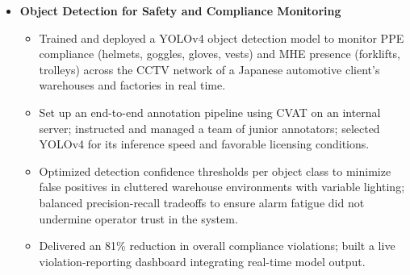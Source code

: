 \documentclass[a4paper,11pt]{article}
\begin{document}
\begin{itemize}[leftmargin=*, itemsep = -1pt]
\begin{itemize}[itemsep = -1pt]
          \item {Fine-tuned EfficientNet-based video classifiers using NVIDIA TAO Toolkit for upto 15 action classes per station; mitigated class imbalance via augmentation and sample-capping; optimized inference pipeline with ONNX (internal testing) and TensorRT (deployment) on NVIDIA A1000 class GPUs.}
          \item {Designed VA/NVA classification logic in collaboration with client operations teams; built shift-wise dashboards covering cycle analysis, deployment adherence, REBA/RULA ergonomics scores, and operator wise Yamazumi charts.}
          \item {Built the company-standard annotation and data-cleaning tool adopted across all productivity deployments; trained 2 junior AI engineers on the full ML pipeline; managed end-to-end client engagements across India and Japan; led 5 additional POCs for clients in India, Australia, and Dubai.}
          \item {Achieved 23\% productivity improvement and 2 FTE saved at the Indian 2-wheeler manufacturer; 100\% error elimination across 7 stations. Contributed to patent documentation for the action recognition architecture.}
        \end{itemize}\vspace{-1pt}
      \item{\textbf{Object Detection for Safety and Compliance Monitoring}}
        \begin{itemize}[itemsep = -1pt]
          \item {Trained and deployed a YOLOv4 object detection model to monitor PPE compliance (helmets, goggles, gloves, vests) and MHE presence (forklifts, trolleys) across the CCTV network of a Japanese automotive client's warehouses and factories in real time.}
          \item {Set up an end-to-end annotation pipeline using CVAT on an internal server; instructed and managed a team of junior annotators; selected YOLOv4 for its inference speed and favorable licensing conditions.}
          \item {Optimized detection confidence thresholds per object class to minimize false positives in cluttered warehouse environments with variable lighting; balanced precision-recall tradeoffs to ensure alarm fatigue did not undermine operator trust in the system.}
          \item {Delivered an 81\% reduction in overall compliance violations; built a live violation-reporting dashboard integrating real-time model output.}
        \end{itemize}\vspace{-1pt}
    \end{itemize}\vspace{-1pt}\item
\end{document}
